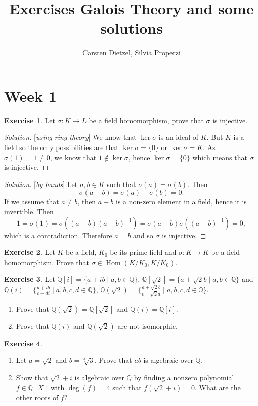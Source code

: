 \documentclass[a4paper,10pt,reqno]{amsart}
\title{Exercises Galois Theory and some solutions}
\author{Carsten Dietzel, Silvia Properzi}
\newcommand{\Q}{\mathbb{Q}}
\newcommand{\Hom}{\operatorname{Hom}}
\theoremstyle{definition} %
\newtheorem{ex}{Exercise}[section]
\newenvironment{sol}
  {\renewcommand\qedsymbol{$\blacksquare$}\begin{proof}[Solution]}
  {\end{proof}}
\begin{document}
\maketitle
\section{Week 1}


\begin{ex}
    Let $\sigma : K\to L$ be a field homomorphism, prove that $\sigma$ is injective.
\end{ex}
\begin{sol}[\textit{using ring theory}]
    We know that $\ker\sigma$ is an ideal of $K$.
    But $K$ is a field so the only possibilities are that $\ker\sigma=\{0\}$ or $\ker\sigma=K$.
    As $\sigma(1)=1\neq 0$, we know that $1\not\in \ker\sigma$, hence $\ker\sigma=\{0\}$ which means that $\sigma$ is injective.
\end{sol}
\begin{sol}[\textit{by hands}]
    Let $a,b\in K$ such that $\sigma(a)=\sigma(b)$.
    Then 
    \[
    \sigma(a-b)=\sigma(a)-\sigma(b)=0.
    \]
    If we assume that $a\neq b$, then $a-b$ is a non-zero element in a field, hence it is invertible.
    Then 
    \[
    1=\sigma(1)=\sigma((a-b)(a-b)^{-1})=
    \sigma(a-b)\sigma((a-b)^{-1})=0,
    \]
    which is a contradiction.
    Therefore $a=b$ and so $\sigma$ is injective.
\end{sol}

\begin{ex}
    Let $K$ be a field, $K_0$ be its prime field and $\sigma:K\to K$ be a field homomorphism. Prove that $\sigma\in\Hom(K/K_0,K/K_0)$.
\end{ex}


\begin{ex}
Let $\Q[i]=\{a+ib\mid a,b\in \Q\}$, $\Q[\sqrt{2}]=\{a+\sqrt{2}b\mid a,b\in\Q\}$ and $\Q(i)=\{\frac{a+ib}{c+di}\mid a,b,c,d\in \Q\}$, $\Q(\sqrt{2})=\{\frac{a+\sqrt{2}b}{c+\sqrt{2}d}\mid a,b,c,d\in\Q\}$.

\begin{enumerate}[label=(\roman*)]
    \item Prove that $\Q(\sqrt{2})=\Q[\sqrt{2}]$ and $\Q(i)=\Q[i]$.
    \item Prove that $\Q(i)$ and $\Q(\sqrt{2})$ are not isomorphic.
\end{enumerate}
\end{ex}

\begin{ex}~
    \begin{enumerate}[label=(\roman*)]
        \item Let $a=\sqrt{2}$ and $b=\sqrt[3]{3}$. Prove that $ab$ is algebraic over $\Q$.
        \item Show that $\sqrt{2} + i$ is algebraic over $\Q$ by finding a nonzero polynomial $f \in \Q[X]$ with $\deg(f) = 4$ such that $f(\sqrt{2} + i) = 0$. What are the other roots of $f$?
    \end{enumerate}
\end{ex}
\end{document}
